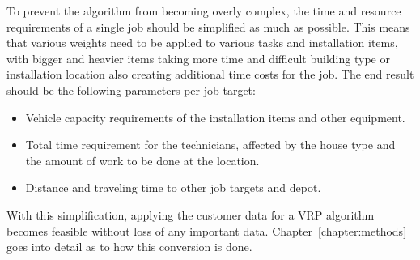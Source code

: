 To prevent the algorithm from becoming overly complex, the time and resource requirements of a single job should be simplified as much as possible. This means that various weights need to be applied to various tasks and installation items, with bigger and heavier items taking more time and difficult building type or installation location also creating additional time costs for the job. The end result should be the following parameters per job target:

\begin{itemize}
\item Vehicle capacity requirements of the installation items and other equipment.
\item Total time requirement for the technicians, affected by the house type and the amount of work to be done at the location.
\item Distance and traveling time to other job targets and depot. 
\end{itemize}

With this simplification, applying the customer data for a VRP algorithm becomes feasible without loss of any important data. Chapter~\ref{chapter:methods} goes into detail as to how this conversion is done.

